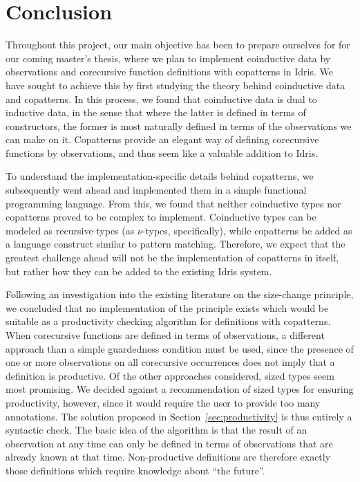 \section{Conclusion}
\label{sec:conclusion}
Throughout this project, our main objective has been to prepare ourselves for for our coming master's thesis, where we plan to implement coinductive data by observations and corecursive function definitions with copatterns in Idris. We have sought to achieve this by first studying the theory behind coinductive data and copatterns. In this process, we found that coinductive data is dual to inductive data, in the sense that where the latter is defined in terms of constructors, the former is most naturally defined in terms of the observations we can make on it. Copatterns provide an elegant way of defining corecursive functions by observations, and thus seem like a valuable addition to Idris. 

To understand the implementation-specific details behind copatterns, we subsequently went ahead and implemented them in a simple functional programming language. From this, we found that neither coinductive types nor copatterns proved to be complex to implement. Coinductive types can be modeled as recursive types (as $\nu$-types, specifically), while copatterns be added as a language construct similar to pattern matching. Therefore, we expect that the greatest challenge ahead will not be the implementation of copatterns in itself, but rather how they can be added to the existing Idris system.

Following an investigation into the existing literature on the size-change principle, we concluded that no implementation of the principle exists which would be suitable as a productivity checking algorithm for definitions with copatterns. When corecursive functions are defined in terms of observations, a different approach than a simple guardedness condition must be used, since the presence of one or more observations on all corecursive occurrences does not imply that a definition is productive. Of the other approaches considered, sized types seem most promising. We decided against a recommendation of sized types for ensuring productivity, however, since it would require the user to provide too many annotations. The solution proposed in Section~\ref{sec:productivity} is thus entirely a syntactic check. The basic idea of the algorithm is that the result of an observation at any time can only be defined in terms of observations that are already known at that time. Non-productive definitions are therefore exactly those definitions which require knowledge about ``the future''.

